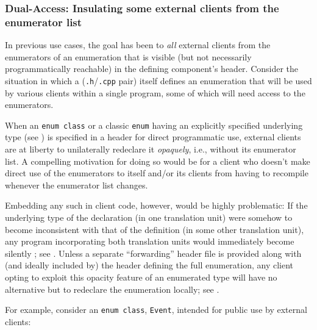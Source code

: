 \subsubsection[Dual-Access: Insulating some external clients from the enumerator list]{Dual-Access: Insulating some external clients from the enumerator list}\label{dual-access:-insulating-some-external-clients-from-the-enumerator-list}

In previous use cases, the goal has been to  \emph{all}
external clients from the enumerators of an enumeration that is visible
(but not necessarily programmatically reachable) in the defining
component's header. Consider the situation in which a 
(\lstinline!.h!/\lstinline!.cpp! pair) itself defines an enumeration that will
be used by various clients within a single program, some of which will
need access to the enumerators.

When an \lstinline!enum!~\lstinline!class! or a classic \lstinline!enum! having
an explicitly specified underlying type (see ) is specified in
a header for direct programmatic use, external clients are at liberty to
unilaterally redeclare it \emph{opaquely}, i.e., without its enumerator
list. A compelling motivation for doing so would be for a client who
doesn't make direct use of the enumerators to  itself
and/or its clients from having to recompile whenever the enumerator list
changes.

Embedding any such  in client code, however,
would be highly problematic: If the underlying type of the declaration
(in one translation unit) were somehow to become inconsistent with that
of the definition (in some other translation unit), any program
incorporating both translation units would immediately become silently
; see . Unless a separate ``forwarding'' header file is
provided along with (and ideally included by) the header defining the
full enumeration, any client opting to exploit this
opacity feature of an enumerated type will have no alternative but to
redeclare the enumeration locally; see .

For example, consider an \lstinline!enum!~\lstinline!class!, \lstinline!Event!,
intended for public use by external clients:

